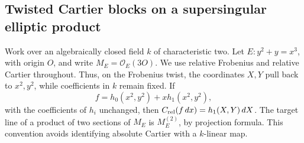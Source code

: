 \subsection{Twisted Cartier blocks on a supersingular elliptic product}

Work over an algebraically closed field \(k\) of characteristic two.
Let \(E:y^2+y=x^3\), with origin \(O\), and write
\(M_E=\mathcal O_E(3O)\). We use relative Frobenius and relative
Cartier throughout. Thus, on the Frobenius twist, the coordinates
\(X,Y\) pull back to \(x^2,y^2\), while coefficients in \(k\)
remain fixed. If
\[
 f=h_0(x^2,y^2)+x h_1(x^2,y^2),
\]
with the coefficients of \(h_i\) unchanged, then
\(C_{\rm rel}(f\,dx)=h_1(X,Y)\,dX\).
The target line of a product of two sections of \(M_E\) is
\(M_E^{(2)}\), by projection formula. This convention avoids
identifying absolute Cartier with a \(k\)-linear map.

